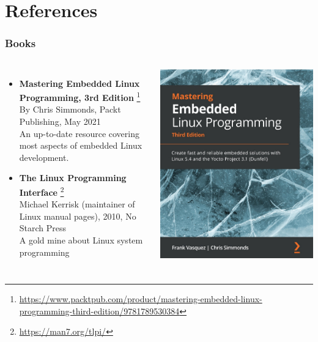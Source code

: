 \section{References}

\begin{frame}
  \frametitle{Books}
  \begin{columns}
    \small
    \begin{itemize}
    \item {\bf Mastering Embedded Linux Programming, 3rd Edition}
      \footnote{\tiny
\url{https://www.packtpub.com/product/mastering-embedded-linux-programming-third-edition/9781789530384}}\\
      By Chris Simmonds, Packt Publishing, May 2021\\
      An up-to-date resource covering most aspects of embedded Linux
      development.
    \item {\bf The Linux Programming Interface}
      \footnote{\tiny \url{https://man7.org/tlpi/}}\\
      Michael Kerrisk (maintainer of Linux manual pages), 2010, No Starch Press\\
      A gold mine about Linux system programming\\
    \end{itemize}
    \normalsize
    \includegraphics[height=0.25\textheight]{slides/sysdev-references/book-mastering-embedded-linux3.jpg}\\

\end{columns}
\end{frame}
